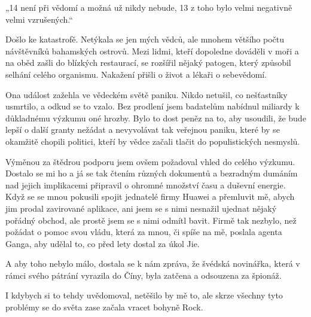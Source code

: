 „14 není při vědomí a možná už nikdy nebude, 13 z toho bylo velmi negativně velmi vzrušených.“

Došlo ke katastrofě. Netýkala se jen mých vědců, ale mnohem většího počtu návštěvníků bahamských ostrovů. Mezi lidmi, kteří dopoledne dováděli v moři a na oběd zašli do blízkých restaurací, se rozšířil nějaký patogen, který způsobil selhání celého organismu. Nakažení přišli o život a lékaři o sebevědomí.

Ona událost zažehla ve vědeckém světě paniku. Nikdo netušil, co nešťastníky usmrtilo, a odkud se to vzalo. Bez prodlení jsem badatelům nabídnul miliardy k důkladnému výzkumu oné hrozby. Bylo to dost peněz na to, aby usoudili, že bude lepší o další granty nežádat a nevyvolávat tak veřejnou paniku, které by se okamžitě chopili politici, kteří by vědce začali tlačit do populistických nesmyslů.

Výměnou za štědrou podporu jsem ovšem požadoval vhled do celého výzkumu. Dostalo se mi ho a já se tak čtením různých dokumentů a bezradným dumáním nad jejich implikacemi připravil o ohromné množství času a duševní energie. Když se se mnou pokusili spojit jednatelé firmy Huawei a přemluvit mě, abych jim prodal zavirované aplikace, ani jsem se s nimi nesnažil ujednat nějaký pořádný obchod, ale prostě jsem se s nimi odmítl bavit. Firmě tak nezbylo, než požádat o pomoc svou vládu, která za mnou, či spíše na mě, poslala agenta Ganga, aby udělal to, co před lety dostal za úkol Jie.

A aby toho nebylo málo, dostala se k nám zpráva, že švédská novinářka, která v rámci svého pátrání vyrazila do Číny, byla zatčena a odsouzena za špionáž.
\vspace{0.75cm}

I kdybych si to tehdy uvědomoval, netěšilo by mě to, ale skrze všechny tyto problémy se do světa zase začala vracet bohyně Rock.
